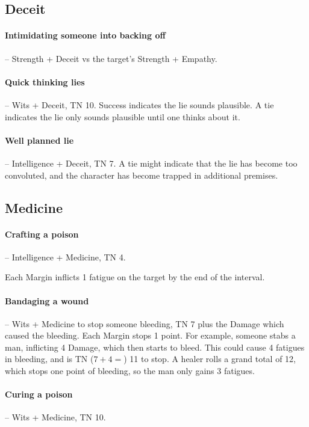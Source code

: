 \begin{multicols}{2}
\subsection{Deceit}

\paragraph{Intimidating someone into backing off} -- Strength + Deceit vs the target's Strength + Empathy.

\paragraph{Quick thinking lies} -- Wits + Deceit, TN 10.
Success indicates the lie sounds plausible.
A tie indicates the lie only sounds plausible until one thinks about it.

\paragraph{Well planned lie} -- Intelligence + Deceit, TN 7.
A tie might indicate that the lie has become too convoluted, and the character has become trapped in additional premises.

\subsection{Medicine}

\paragraph{Crafting a poison} -- Intelligence + Medicine, TN 4.
\label{poison}

Each Margin inflicts 1 \gls{fatigue} on the target by the end of the interval.

\paragraph{Bandaging a wound} -- Wits + Medicine to stop someone bleeding, TN 7 plus the Damage which caused the bleeding.
Each Margin stops 1 point.
For example, someone stabs a man, inflicting 4 Damage, which then starts to bleed.
This could cause 4 \glspl{fatigue} in bleeding, and is TN ($7 + 4 = $) 11 to stop.
A healer rolls a grand total of 12, which stops one point of bleeding, so the man only gains 3 \glspl{fatigue}.

\paragraph{Curing a poison} -- Wits + Medicine, TN 10.


\end{multicols}
